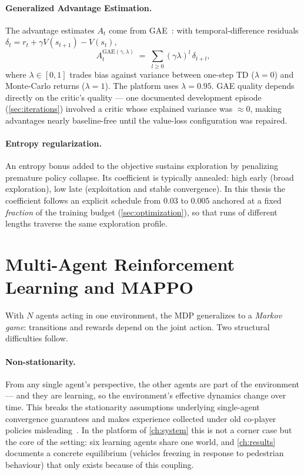 \paragraph{Generalized Advantage Estimation.}
The advantage estimates $A_t$ come from GAE~\cite{schulman2016gae}:
with temporal-difference residuals
$\delta_t = r_t + \gamma V(s_{t+1}) - V(s_t)$,
\begin{equation}
  A_t^{\mathrm{GAE}(\gamma,\lambda)} \;=\;
  \sum_{l \geq 0} (\gamma\lambda)^{l}\, \delta_{t+l},
\end{equation}
where $\lambda \in [0,1]$ trades bias against variance between one-step
TD ($\lambda = 0$) and Monte-Carlo returns ($\lambda = 1$). The platform
uses $\lambda = 0.95$. GAE quality depends directly on the critic's
quality --- one documented development episode
(\cref{sec:iterations}) involved a critic whose explained variance was
$\approx 0$, making advantages nearly baseline-free until the
value-loss configuration was repaired.

\paragraph{Entropy regularization.}
An entropy bonus added to the objective sustains exploration by
penalizing premature policy collapse. Its coefficient is typically
annealed: high early (broad exploration), low late (exploitation and
stable convergence). In this thesis the coefficient follows an explicit
schedule from $0.03$ to $0.005$ anchored at a fixed \emph{fraction} of
the training budget (\cref{sec:optimization}), so that runs of different
lengths traverse the same exploration profile.

\section{Multi-Agent Reinforcement Learning and MAPPO}
\label{sec:marl}

With $N$ agents acting in one environment, the MDP generalizes to a
\emph{Markov game}: transitions and rewards depend on the joint action.
Two structural difficulties follow.

\paragraph{Non-stationarity.}
From any single agent's perspective, the other agents are part of the
environment --- and they are learning, so the environment's effective
dynamics change over time. This breaks the stationarity assumptions
underlying single-agent convergence guarantees and makes
experience collected under old co-player policies
misleading~\cite{lowe2017maddpg}. In the platform of \cref{ch:system}
this is not a corner case but the core of the setting: six learning
agents share one world, and \cref{ch:results} documents a concrete
equilibrium (vehicles freezing in response to pedestrian behaviour) that
only exists because of this coupling.

